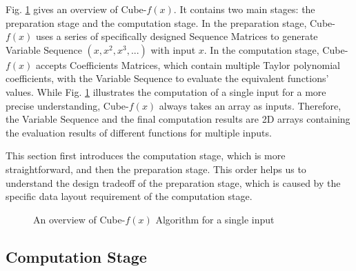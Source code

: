 \documentclass[12pt]{extbook}
\begin{document}
Fig. \ref{fig:overview} gives an overview of Cube-$f(x)$. It contains two main stages: the preparation stage and the computation stage. In the preparation stage, Cube-$f(x)$ uses a series of specifically designed Sequence Matrices to generate Variable Sequence $(x, x^2, x^3, ...)$ with input $x$. In the computation stage, Cube-$f(x)$ accepts Coefficients Matrices, which contain multiple Taylor polynomial coefficients, with the Variable Sequence to evaluate the equivalent functions' values. While Fig. \ref{fig:overview} illustrates the computation of a single input for a more precise understanding, Cube-$f(x)$ always takes an array as inputs. Therefore, the Variable Sequence and the final computation results are 2D arrays containing the evaluation results of different functions for multiple inputs.

This section first introduces the computation stage, which is more straightforward, and then the preparation stage. This order helps us to understand the design tradeoff of the preparation stage, which is caused by the specific data layout requirement of the computation stage.

\begin{figure}[t]
    \caption{An overview of Cube-$f(x)$ Algorithm for a single input}
    \label{fig:overview}
    \end{figure}

\subsection{Computation Stage}
\end{document}
